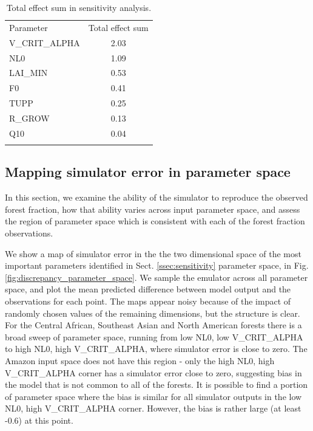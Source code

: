 \documentclass[esd, article]{copernicus} %
\begin{document}
\begin{table}[t]
\caption{Total effect sum in sensitivity analysis.}\label{tab:effects_sum}
\begin{tabular}{lc}

\tophline
Parameter &  Total effect sum \\
V\_CRIT\_ALPHA & 2.03 \\
NL0 & 1.09 \\
LAI\_MIN & 0.53 \\
F0 & 0.41 \\
TUPP & 0.25 \\
R\_GROW  & 0.13 \\
Q10 & 0.04 \\

\bottomhline
\end{tabular}
\belowtable{} %
\end{table}


\subsection{Mapping simulator error in parameter space}\label{ssec:mapping}

In this section, we examine the ability of the simulator to reproduce the observed forest fraction, how that ability varies across input parameter space, and assess the region of parameter space which is consistent with each of the forest fraction observations.

We show a map of simulator error in the the two dimensional space of the most important parameters identified in Sect. \ref{ssec:sensitivity} parameter space, in Fig.  \ref{fig:discrepancy_parameter_space}. We sample the emulator across all parameter space, and plot the mean predicted difference between model output and the observations for each point. The maps appear noisy because of the impact of randomly chosen values of the remaining dimensions, but the structure is clear. For the Central African, Southeast Asian and North American forests there is a broad sweep of parameter space, running from low NL0, low V\_CRIT\_ALPHA to high NL0, high V\_CRIT\_ALPHA, where simulator error is close to zero. The Amazon input space does not have this region - only the high NL0, high V\_CRIT\_ALPHA corner has a simulator error close to zero, suggesting bias in the model that is not common to all of the forests. It is possible to find a portion of parameter space where the bias is similar for all simulator outputs in the low NL0, high V\_CRIT\_ALPHA corner. However, the bias is rather large (at least -0.6) at this point.
\end{document}
